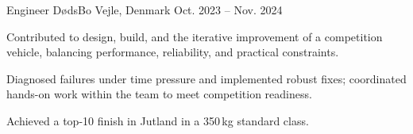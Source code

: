 \begin{cventries}
  \cventry
    {Engineer} %
    {DødsBo} %
    {Vejle, Denmark} %
    {Oct. 2023 -- Nov. 2024} %
    {
      \begin{cvitems} %
      \item Contributed to design, build, and the iterative improvement of a competition vehicle, balancing performance, reliability, and practical constraints.
      \item Diagnosed failures under time pressure and implemented robust fixes; coordinated hands-on work within the team to meet competition readiness.
      \item Achieved a top-10 finish in Jutland in a 350\,kg standard class.
      \end{cvitems}
    }
\end{cventries}
